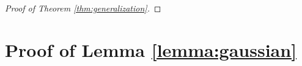 \begin{proof}[Proof of Theorem \ref{thm:generalization}]
\end{proof}


\section{Proof of Lemma \ref{lemma:gaussian}}\label{proof:gaussian}

